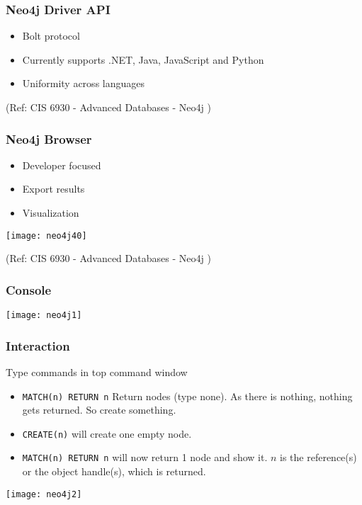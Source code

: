 \begin{frame}\frametitle{Neo4j Driver API}


\begin{itemize}
\item  Bolt protocol
\item   Currently supports .NET, Java, JavaScript and Python
\item   Uniformity across languages
\end{itemize}


{\tiny (Ref: CIS 6930 - Advanced Databases - Neo4j )}
\end{frame}

\begin{frame}\frametitle{Neo4j Browser}


\begin{itemize}
\item   Developer focused
\item    Export results
\item   Visualization
\end{itemize}

\begin{center}
\texttt{[image: neo4j40]}
\end{center}	 

{\tiny (Ref: CIS 6930 - Advanced Databases - Neo4j )}
\end{frame}



\begin{frame}[fragile]\frametitle{Console}

\begin{center}
\texttt{[image: neo4j1]}
\end{center}	  


\end{frame}

\begin{frame}[fragile]\frametitle{Interaction}

Type commands in top command window

\begin{itemize}
\item \lstinline|MATCH(n) RETURN n| Return nodes (type none). As there is nothing, nothing gets returned. So create something.
\item \lstinline|CREATE(n)| will create one empty node.
\item \lstinline|MATCH(n) RETURN n| will now return 1 node and show it. $n$ is the reference(s) or the object handle(s), which is returned.
\end{itemize}

\begin{center}
\texttt{[image: neo4j2]}
\end{center}

\end{frame}


